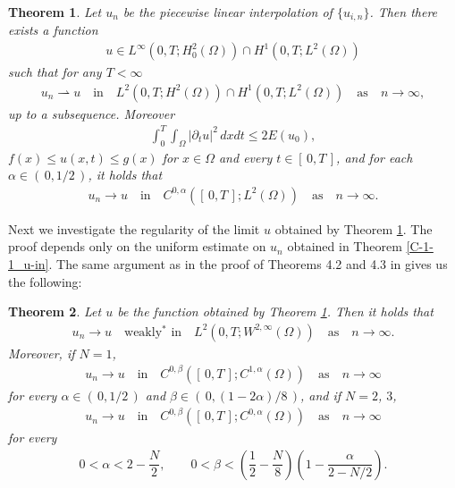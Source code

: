 \documentclass[12pt]{amsart}
\newtheorem{thm}{Theorem}[section]
\begin{document}
\begin{thm} \label{conv-1}
Let $u_n$ be the piecewise linear interpolation of $\{ u_{i,n} \}$. Then there exists a function 
\begin{align*}
u \in L^\infty(0,T;H^2_0(\Omega)) \cap H^1(0,T;L^2(\Omega)) 
\end{align*}
such that for any $T<\infty$ 
\begin{align*}
u_n \rightharpoonup u \quad \text{in} \quad L^2(0,T;H^2(\Omega)) \cap H^1(0,T;L^2(\Omega)) 
\quad \text{as} \quad n \to \infty, 
\end{align*}
up to a subsequence. Moreover 
\begin{align*}
\int^T_0 \!\!\! \int_\Omega {\left| {{\partial}_t u} \right|}^2 \, dx dt \le 2 E(u_0), 
\end{align*}
$f(x) \le u(x,t) \le g(x)$ for $x \in \Omega$ and every $t \in [\, 0,T \,]$, and for each ${\alpha} \in (\, 0,1/2 \,)$, 
it holds that 
\begin{align*}
u_n \to u  \quad \text{in} \quad C^{0,{\alpha}}([\, 0,T \,];L^2(\Omega)) \quad \text{as} \quad n \to \infty. 
\end{align*} 
\end{thm}

Next we investigate the regularity of the limit $u$ obtained by Theorem \ref{conv-1}. 
The proof depends only on the uniform estimate on $u_{n}$ obtained in Theorem \ref{C-1-1_u-in}. 
The same argument as in the proof of Theorems 4.2 and 4.3 in \cite{NO} gives us the following:
\begin{thm}
Let $u$ be the function obtained by Theorem \ref{conv-1}. Then it holds that 
\begin{align*}
u_n \to u \quad \text{weakly$^\ast$ in} \quad L^2(0,T;W^{2, \infty}(\Omega)) \quad \text{as} \quad n \to \infty. 
\end{align*} 
Moreover, if $N=1$, 
\begin{align*}
u_n \to u \quad \text{in} \quad C^{0,{\beta}}([\, 0,T \,];C^{1, {\alpha}}(\Omega)) \quad \text{as} \quad n \to \infty
\end{align*}
for every ${\alpha} \in (\, 0,1/2 \,)$ and ${\beta} \in (\, 0, (1-2{\alpha})/8 \,)$, and if $N=2$, $3$, 
\begin{align*}
u_n \to u \quad \text{in} \quad C^{0,{\beta}}([\, 0,T \,];C^{0, {\alpha}}(\Omega)) \quad \text{as} \quad n \to \infty
\end{align*}
for every 
\begin{align*}
0 < {\alpha} <  2 - \dfrac{N}{2},  \qquad 0 < {\beta} <  \left( \dfrac{1}{2} - \dfrac{N}{8} \right) \left( 1 - \dfrac{\alpha}{2 - N/2} \right). 
\end{align*}
\end{thm}
\end{document}
